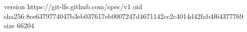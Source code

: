 version https://git-lfs.github.com/spec/v1
oid sha256:8ee6379774047b3eb037617eb0007247d4671142cc2c4014d42fab4f64377769
size 66204
